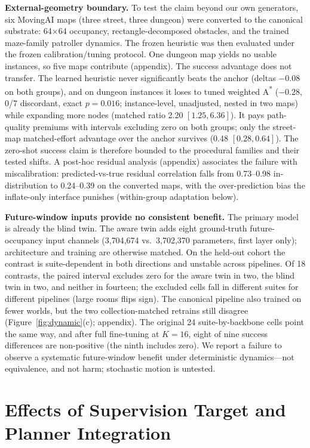 \documentclass[letterpaper]{article} %
\begin{document}
\textbf{External-geometry boundary.} To test the claim beyond our own generators, six MovingAI maps \citep{sturtevant2012movingai} (three street, three dungeon) were converted to the canonical substrate: 64$\times$64 occupancy, rectangle-decomposed obstacles, and the trained maze-family patroller dynamics. The frozen heuristic was then evaluated under the frozen calibration/tuning protocol. One dungeon map yields no usable instances, so five maps contribute (appendix). The success advantage does not transfer. The learned heuristic never significantly beats the anchor (deltas $-0.08$ on both groups), and on dungeon instances it loses to tuned weighted A\textsuperscript{*} ($-0.28$, 0/7 discordant, exact $p{=}0.016$; instance-level, unadjusted, nested in two maps) while expanding more nodes (matched ratio 2.20 $[1.25, 6.36]$). It pays path-quality premiums with intervals excluding zero on both groups; only the street-map matched-effort advantage over the anchor survives (0.48 $[0.28, 0.64]$). The zero-shot success claim is therefore bounded to the procedural families and their tested shifts. A post-hoc residual analysis (appendix) associates the failure with miscalibration: predicted-vs-true residual correlation falls from 0.73--0.98 in-distribution to 0.24--0.39 on the converted maps, with the over-prediction bias the inflate-only interface punishes (within-group adaptation below).

\textbf{Future-window inputs provide no consistent benefit.} The primary model is already the blind twin. The aware twin adds eight ground-truth future-occupancy input channels (3{,}704{,}674 vs.\ 3{,}702{,}370 parameters, first layer only); architecture and training are otherwise matched. On the held-out cohort the contrast is suite-dependent in both directions and unstable across pipelines. Of 18 contrasts, the paired interval excludes zero for the aware twin in two, the blind twin in two, and neither in fourteen; the excluded cells fall in different suites for different pipelines (large rooms flips sign). The canonical pipeline also trained on fewer worlds, but the two collection-matched retrains still disagree (Figure~\ref{fig:dynamic}(c); appendix). The original 24 suite-by-backbone cells point the same way, and after full fine-tuning at $K{=}16$, eight of nine success differences are non-positive (the ninth includes zero). We report a failure to observe a systematic future-window benefit under deterministic dynamics---not equivalence, and not harm; stochastic motion is untested.

\section{Effects of Supervision Target and Planner Integration}
\end{document}
